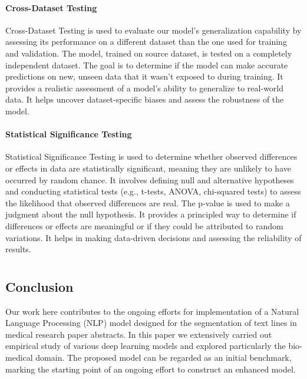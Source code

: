 \documentclass[12pt,a4paper]{report}     %
\begin{document}
\begin{normalsize}
{{\subsubsection{Cross-Dataset Testing}
Cross-Dataset Testing is used to evaluate our model's generalization capability by assessing its performance on a different dataset than the one used for training and validation. The model, trained on source dataset, is tested on a completely independent dataset. The goal is to determine if the model can make accurate predictions on new, unseen data that it wasn't exposed to during training. It provides a realistic assessment of a model's ability to generalize to real-world data. It helps uncover dataset-specific biases and assess the robustness of the model.
\subsubsection{Statistical Significance Testing}
Statistical Significance Testing is used to determine whether observed differences or effects in data are statistically significant, meaning they are unlikely to have occurred by random chance. It involves defining null and alternative hypotheses and conducting statistical tests (e.g., t-tests, ANOVA, chi-squared tests) to assess the likelihood that observed differences are real. The p-value is used to make a judgment about the null hypothesis. It provides a principled way to determine if differences or effects are meaningful or if they could be attributed to random variations. It helps in making data-driven decisions and assessing the reliability of results.


\newpage 
\chapter{}
{\setlength{\baselineskip}{1.1\baselineskip}
\section{Conclusion}
Our work here contributes to the ongoing efforts for implementation of a Natural Language Processing (NLP) model designed for the segmentation of text lines in medical research paper abstracts. In this paper we extensively carried out empirical study of various deep learning models and explored particularly the bio-medical domain. The proposed model can be regarded as an initial benchmark, marking the starting point of an ongoing effort to construct an enhanced model.
}}}
\end{normalsize}
\end{document}
